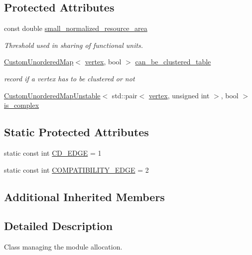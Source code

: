 \subsection*{Protected Attributes}
\begin{DoxyCompactItemize}
\item 
const double \hyperlink{classcdfc__module__binding_ad5ab157aa37ee91f67cd6a92cb5b0845}{small\+\_\+normalized\+\_\+resource\+\_\+area}
\begin{DoxyCompactList}\small\item\em Threshold used in sharing of functional units. \end{DoxyCompactList}\item 
\hyperlink{custom__map_8hpp_ad1ed68f2ff093683ab1a33522b144adc}{Custom\+Unordered\+Map}$<$ \hyperlink{graph_8hpp_abefdcf0544e601805af44eca032cca14}{vertex}, bool $>$ \hyperlink{classcdfc__module__binding_a089a62ab1ebf57334b0b0529388cccbd}{can\+\_\+be\+\_\+clustered\+\_\+table}
\begin{DoxyCompactList}\small\item\em record if a vertex has to be clustered or not \end{DoxyCompactList}\item 
\hyperlink{custom__map_8hpp_a8cbaceffc09790a885ec7e9c17809c69}{Custom\+Unordered\+Map\+Unstable}$<$ std\+::pair$<$ \hyperlink{graph_8hpp_abefdcf0544e601805af44eca032cca14}{vertex}, unsigned int $>$, bool $>$ \hyperlink{classcdfc__module__binding_abfc4ddc64d944728b45427e1c7c05041}{is\+\_\+complex}
\end{DoxyCompactItemize}
\subsection*{Static Protected Attributes}
\begin{DoxyCompactItemize}
\item 
static const int \hyperlink{classcdfc__module__binding_a933e5ed93d35dada40ecd3d52757ee2e}{C\+D\+\_\+\+E\+D\+GE} = 1
\item 
static const int \hyperlink{classcdfc__module__binding_adde868d130c8198336889bac652850c5}{C\+O\+M\+P\+A\+T\+I\+B\+I\+L\+I\+T\+Y\+\_\+\+E\+D\+GE} = 2
\end{DoxyCompactItemize}
\subsection*{Additional Inherited Members}


\subsection{Detailed Description}
Class managing the module allocation. 

